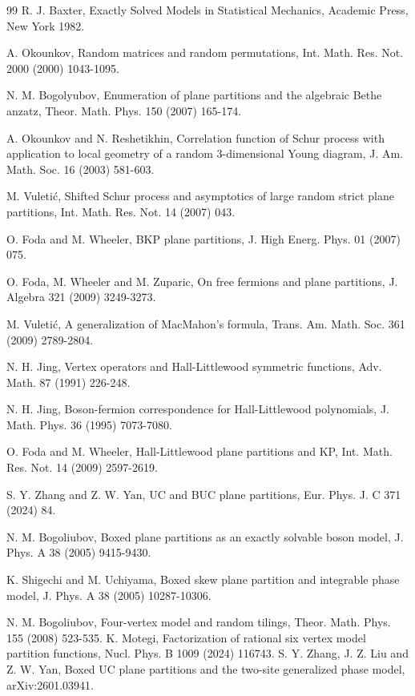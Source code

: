 \documentclass[11pt,reqno]{amsart}
\numberwithin{equation}{section}
\begin{document}
\begin{thebibliography}{99}
		 R. J. Baxter, Exactly Solved Models in Statistical Mechanics, Academic Press, New York 1982.
		
		A. Okounkov, Random matrices and random permutations, Int. Math. Res. Not. 2000 (2000) 1043-1095.
		
		N. M. Bogolyubov, Enumeration of plane partitions and the algebraic Bethe anzatz, Theor. Math. Phys. 150 (2007) 165-174.
		
		 A. Okounkov and N. Reshetikhin, Correlation function of Schur process with application to local geometry of a random 3-dimensional Young diagram, J. Am. Math. Soc. 16 (2003) 581-603.
		
		  M. Vuleti\'{c}, Shifted Schur process and asymptotics of large random strict plane partitions, Int. Math. Res. Not. 14 (2007) 043.
		
		 O. Foda and M. Wheeler, BKP plane partitions, J. High Energ. Phys.  01 (2007) 075.
		
		 O. Foda, M. Wheeler and M. Zuparic, On free fermions and plane partitions, J. Algebra 321 (2009) 3249-3273.
		
		 M. Vuleti\'{c}, A generalization of MacMahon's formula, Trans. Am. Math. Soc. 361 (2009) 2789-2804.
		
		N. H. Jing, Vertex operators and Hall-Littlewood symmetric functions, Adv. Math. 87 (1991) 226-248.
		
		N. H. Jing, Boson-fermion correspondence for Hall-Littlewood polynomials, J. Math. Phys. 36 (1995) 7073-7080.
		
		 O. Foda and M. Wheeler, Hall-Littlewood plane partitions and KP, Int. Math. Res. Not. 14  (2009) 2597-2619.
		
		S. Y. Zhang and Z. W. Yan, UC and BUC plane partitions, Eur. Phys. J. C 371 (2024) 84.
		
		N. M. Bogoliubov, Boxed plane partitions as an exactly solvable boson model, J. Phys. A 38 (2005) 9415-9430.	
		
		K. Shigechi and M. Uchiyama, Boxed skew plane partition and integrable phase model, J. Phys. A 38 (2005) 10287-10306.	
		
		 N. M. Bogoliubov, Four-vertex model and random tilings, Theor. Math. Phys. 155 (2008) 523-535.
			K. Motegi, Factorization of rational six vertex model partition functions,  Nucl. Phys. B 1009 (2024) 116743.
		S. Y. Zhang, J. Z. Liu and Z. W. Yan, Boxed UC plane partitions and the two-site generalized phase model, arXiv:2601.03941.
		

\end{thebibliography}
\end{document}
